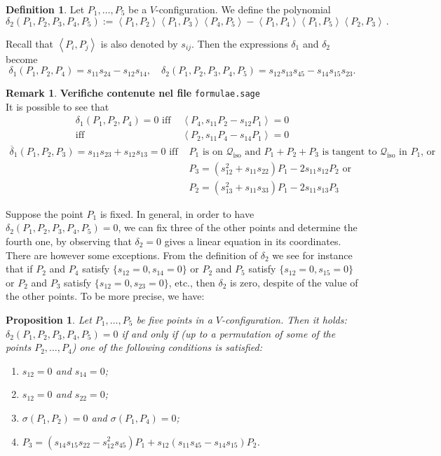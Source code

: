 \documentclass{amsart}
\theoremstyle{plain}
\newtheorem{prop}[lemma]{Proposition}
\theoremstyle{definition}
\newtheorem{definition}[lemma]{Definition}
\newtheorem{rmk}[lemma]{Remark}
\newcommand{\iso}{\mathcal{Q}_{\mathrm{iso}}}
\newcommand{\scl}[2]{\left\langle {#1}, {#2} \right\rangle}
\begin{document}
\begin{definition}
 Let $P_1, \dots, P_5$ be a $V$-configuration.
We define the polynomial
 \[
  \delta_2(P_1, P_2, P_3, P_4, P_5) :=
  \scl{P_1}{P_2} \scl{P_1}{P_3} \scl{P_4}{P_5} -
  \scl{P_1}{P_4} \scl{P_1}{P_5} \scl{P_2}{P_3} \,.
 \]
\end{definition}
Recall that $\scl{P_i}{P_j}$ is also denoted by $s_{ij}$.
Then the expressions $\delta_1$ and $\delta_2$ become
\[
\delta_1(P_1, P_2, P_4) = s_{11} s_{24}-s_{12}s_{14},
\quad \delta_2(P_1, P_2, P_3, P_4, P_5) =s_{12}s_{13}s_{45}-s_{14}s_{15} s_{23}.
\]
%
\begin{rmk}
\label{rmk:characteristics_d1_d2}
\textbf{Verifiche contenute nel file} \verb+formulae.sage+ \\
It is possible to see that
%
\begin{align}
\label{rmk_delta_case1}
\delta_1(P_1, P_2, P_4) = 0 \mbox{ iff } &\scl{P_4}{s_{11}P_2-s_{12}P_1} = 0\\
 \mbox{iff } &\scl{P_2}{s_{11}P_4-s_{14}P_1} = 0 \nonumber
\end{align}
\begin{align}
\label{rmk_delta_case2}
\overline{\delta}_1(P_1, P_2, P_3) = s_{11} s_{23}+s_{12}s_{13} =0 \mbox{ iff } &
P_1 \mbox{ is on~$\iso$ and } P_1 + P_2 + P_3 \mbox{ is tangent to~$\iso$ in $P_1$, or} \\
& P_3 = (s_{12}^2+s_{11}s_{22})P_1-2s_{11}s_{12}P_2 \mbox{ or} \nonumber \\
& P_2 = (s_{13}^2+s_{11}s_{33})P_1-2s_{11}s_{13}P_3 \nonumber
\end{align}

\end{rmk}
Suppose the point $P_1$ is fixed. In general, in order to have
$\delta_2(P_1, P_2, P_3, P_4, P_5) = 0$, we can fix three of the other points
and determine the fourth one, by observing
that $\delta_2=0$ gives a linear equation in its coordinates. There are
however
some exceptions. From the definition of $\delta_2$ we see for instance that
if $P_2$ and $P_4$ satisfy $\{s_{12}=0, s_{14}=0\}$ or $P_2$ and
$P_5$ satisfy $\{s_{12}=0, s_{15}=0\}$ or $P_2$ and $P_3$ satisfy
$\{s_{12}=0, s_{23}=0\}$, etc., then $\delta_2$ is zero,
despite of the value of the other points. To be more precise, we have:
%
\begin{prop}
\label{prop:definitionP3}
Let $P_1, \dots, P_5$ be five points in a $V$-configuration. Then it holds:
$\delta_2(P_1, P_2, P_3, P_4, P_5) = 0$ if and only if (up to a permutation
of some of the points $P_2, \dots, P_4$) one of the following conditions
is satisfied:
\begin{enumerate}
\item $s_{12} = 0$ and $s_{14} = 0$;
\label{defP3_1}
\item $s_{12} = 0$ and $s_{22} = 0$;
\label{defP3_2}
\item $\sigma(P_1, P_2) = 0$ and $\sigma(P_1, P_4) = 0$;
\label{defP3_3}
\item $P_3 = (s_{14}s_{15}s_{22}-s_{12}^2s_{45})P_1  +s_{12}(s_{11}s_{45}-s_{14}s_{15})P_2$.
\label{defP3_4}
\end{enumerate}
\end{prop}
\end{document}
